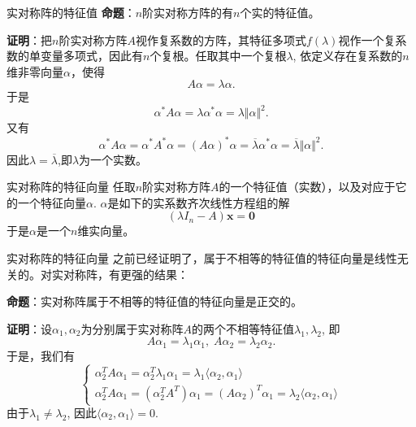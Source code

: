 \begin{frame}

\begin{block}{实对称阵的特征值}
{\bfseries 命题}：$n$阶实对称方阵的有$n$个实的特征值。

\vspace{1em}
\pause

{\bfseries 证明}：把$n$阶实对称方阵$A$视作复系数的方阵，其特征多项式$f(\lambda)$视作一个复系数的单变量多项式，因此有$n$个复根。任取其中一个复根$\lambda$, 依定义存在复系数的$n$维非零向量$\alpha$，使得
\[A\alpha = \lambda\alpha.\]
于是
\[\alpha^*A\alpha = \lambda \alpha^*\alpha = \lambda \Vert \alpha \Vert^2.\]
又有
\[\alpha^*A\alpha = \alpha^*A^*\alpha = (A\alpha)^*\alpha = \overline{\lambda}\alpha^*\alpha = \overline{\lambda} \Vert \alpha \Vert^2.\]
因此$\lambda = \overline{\lambda}$,即$\lambda$为一个实数。
\end{block}

\end{frame}


\begin{frame}

\begin{block}{实对称阵的特征向量}
任取$n$阶实对称方阵$A$的一个特征值（实数），以及对应于它的一个特征向量$\alpha$. $\alpha$是如下的实系数齐次线性方程组的解
\[(\lambda I_n - A)\mathbf{x} = \mathbf{0}\]
于是$\alpha$是一个$n$维实向量。
\end{block}

\end{frame}


\begin{frame}

\begin{block}{实对称阵的特征向量}
之前已经证明了，属于不相等的特征值的特征向量是线性无关的。对实对称阵，有更强的结果：

\vspace{1em}
\pause

{\bfseries 命题}：实对称阵属于不相等的特征值的特征向量是正交的。

\vspace{1em}
\pause

{\bfseries 证明}：设$\alpha_1, \alpha_2$为分别属于实对称阵$A$的两个不相等特征值$\lambda_1, \lambda_2$, 即
\[A\alpha_1 = \lambda_1\alpha_1, \; A\alpha_2 = \lambda_2\alpha_2.\]
于是，我们有
\[\begin{cases}
\alpha_2^T A\alpha_1 = \alpha_2^T\lambda_1\alpha_1 = \lambda_1 \langle \alpha_2, \alpha_1 \rangle \\
\alpha_2^T A\alpha_1 = (\alpha_2^T A^T)\alpha_1 = (A\alpha_2)^T\alpha_1 = \lambda_2 \langle \alpha_2, \alpha_1 \rangle
\end{cases}\]
由于$\lambda_1 \neq \lambda_2$, 因此$\langle \alpha_2, \alpha_1 \rangle = 0.$
\end{block}

\end{frame}

